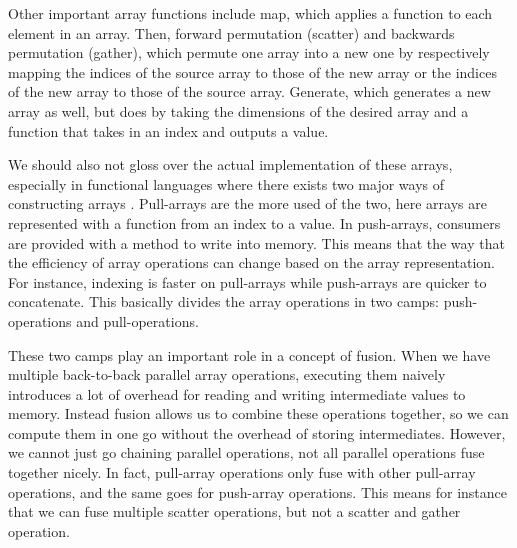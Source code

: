         Other important array functions include map, which applies a function to each element in an array.
        Then, forward permutation (scatter) and backwards permutation (gather), which permute one array into a new one by respectively mapping the indices of the source array to those of the new array or the indices of the new array to those of the source array.
        Generate, which generates a new array as well, but does by taking the dimensions of the desired array and a function that takes in an index and outputs a value.

        We should also not gloss over the actual implementation of these arrays, especially in functional languages where there exists two major ways of constructing arrays \cite{svensson2014defunctionalizing}.
        Pull-arrays are the more used of the two, here arrays are represented with a function from an index to a value.
        In push-arrays, consumers are provided with a method to write into memory.
        This means that the way that the efficiency of array operations can change based on the array representation.
        For instance, indexing is faster on pull-arrays while push-arrays are quicker to concatenate.
        This basically divides the array operations in two camps: push-operations and pull-operations.
        
        These two camps play an important role in a concept of fusion.
        When we have multiple back-to-back parallel array operations, executing them naively introduces a lot of overhead for reading and writing intermediate values to memory.
        Instead fusion allows us to combine these operations together, so we can compute them in one go without the overhead of storing intermediates.
        However, we cannot just go chaining parallel operations, not all parallel operations fuse together nicely.
        In fact, pull-array operations only fuse with other pull-array operations, and the same goes for push-array operations.
        This means for instance that we can fuse multiple scatter operations, but not a scatter and gather operation.

